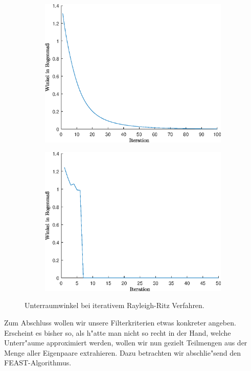 \begin{figure}[h!]
\center
\begin{subfigure}[c]{.4\textwidth}
\includegraphics[width=.9\linewidth]{images/iterRRDistConstant}
\end{subfigure}
\begin{subfigure}[c]{.4\textwidth}
\includegraphics[width=.9\linewidth]{images/iterRRDistIncreasing}
\end{subfigure}
\caption{Unterraumwinkel bei iterativem Rayleigh-Ritz Verfahren.}\label{chap1:im:catinterval}
\end{figure}

\newpage


Zum Abschluss wollen wir unsere Filterkriterien etwas konkreter angeben. Erscheint es bisher so, als h"atte man nicht so recht in der Hand, welche Unterr"aume approximiert werden, wollen wir nun gezielt Teilmengen aus der Menge aller Eigenpaare extrahieren. Dazu betrachten wir abschlie"send den FEAST-Algorithmus.

